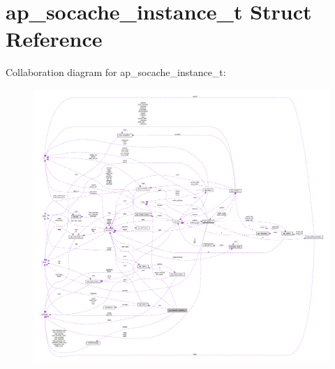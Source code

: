 \hypertarget{structap__socache__instance__t}{}\section{ap\+\_\+socache\+\_\+instance\+\_\+t Struct Reference}
\label{structap__socache__instance__t}


Collaboration diagram for ap\+\_\+socache\+\_\+instance\+\_\+t\+:
\nopagebreak
\begin{figure}[H]
\begin{center}
\leavevmode
\includegraphics[width=350pt]{structap__socache__instance__t__coll__graph}
\end{center}
\end{figure}
